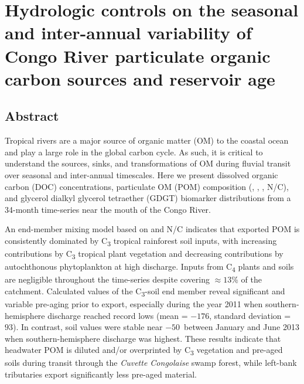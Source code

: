 \chapter{Hydrologic controls on the seasonal and inter-annual variability of Congo River particulate organic carbon sources and reservoir age}
\label{Ch5}
\raggedbottom

{\let\thefootnote\relax{}}

\clearpage

\section{Abstract}

Tropical rivers are a major source of organic matter (OM) to the coastal ocean and play a large role in the global carbon cycle. As such, it is critical to understand the sources, sinks, and transformations of OM during fluvial transit over seasonal and inter-annual timescales. Here we present dissolved organic carbon (DOC) concentrations, particulate OM (POM) composition (, , , N/C), and glycerol dialkyl glycerol tetraether (GDGT) biomarker distributions from a 34-month time-series near the mouth of the Congo River.

An end-member mixing model based on  and N/C indicates that exported POM is consistently dominated by C\textsubscript{3} tropical rainforest soil inputs, with increasing contributions by C\textsubscript{3} tropical plant vegetation and decreasing contributions by autochthonous phytoplankton at high discharge. Inputs from C\textsubscript{4} plants and soils are negligible throughout the time-series despite covering $\approx 13$\% of the catchment. Calculated  values of the C\textsubscript{3}-soil end member reveal significant and variable pre-aging prior to export, especially during the year 2011 when southern-hemisphere discharge reached record lows (mean = $-176$\textperthousand, standard deviation = $93$\textperthousand). In contrast, soil  values were stable near $-50$\textperthousand\ between January and June 2013 when southern-hemisphere discharge was highest. These results indicate that headwater POM is diluted and/or overprinted by C\textsubscript{3} vegetation and pre-aged soils during transit through the \textit{Cuvette Congolaise} swamp forest, while left-bank tributaries export significantly less pre-aged material.

